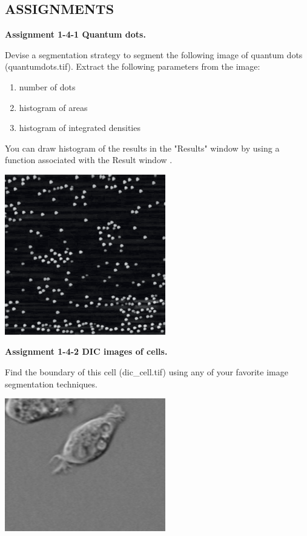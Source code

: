 \clearpage


\subsection{ASSIGNMENTS}

\textbf{\sffamily
Assignment 1-4-1 Quantum dots.}

Devise a segmentation strategy to segment
the following image of quantum dots (quantumdots.tif). Extract the
following parameters from the image: 
\begin{enumerate} 
\item number of dots
\item histogram of areas
\item histogram of integrated densities 
\end{enumerate}
You can draw histogram of the results in the "Results" window by using a
function associated with the Result window .\\

{\centering 
\includegraphics[width=7cm]{fig/CMCIBasicCourse201102-img125.png}
\par}

\textbf{\sffamily
Assignment 1-4-2  DIC images of cells. }

Find the boundary of this cell (dic\_cell.tif) using any of your favorite image segmentation techniques.\\

{\centering 
\includegraphics[width=7cm]{fig/CMCIBasicCourse201102-img126.png}
\par}

